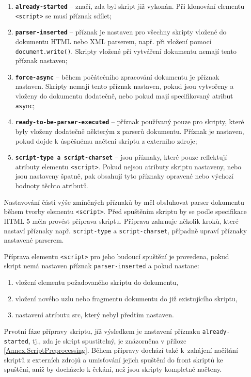 \begin{enumerate}
  \item \textbf{\texttt{already-started}} -- značí, zda byl skript již vykonán. Při klonování elementu \texttt{<script>} se musí příznak sdílet;
  \item \textbf{\texttt{parser-inserted}} -- příznak je nastaven pro všechny skripty vložené do dokumentu HTML nebo XML parserem, např. při vložení pomocí \texttt{document.write()}. Skripty vložené při vytváření dokumentu nemají tento příznak nastaven;
  \item \textbf{\texttt{force-async}} -- během počátečního zpracování dokumentu je příznak nastaven. Skripty nemají tento příznak nastaven, pokud jsou vytvořeny a vloženy do dokumentu dodatečně, nebo pokud mají specifikovaný atribut \texttt{async};
  \item \textbf{\texttt{ready-to-be-parser-executed}} -- příznak používaný pouze pro skripty, které byly vloženy dodatečně některým z parserů dokumentu. Příznak je nastaven, pokud dojde k úspěšnému načtení skriptu z externího zdroje;
  \item \textbf{\texttt{script-type a script-charset}} -- jsou příznaky, které pouze reflektují atributy elementu \texttt{<script>}. Pokud nejsou atributy skriptu nastaveny, nebo jsou nastaveny špatně, pak obsahují tyto příznaky opravené nebo výchozí hodnoty těchto atributů.
\end{enumerate}

Nastavování části výše zmíněných příznaků by měl obsluhovat parser dokumentu během tvorby elementu \texttt{<script>}. Před spuštěním skriptu by se podle specifikace HTML 5 měla provést příprava skriptu. Příprava zahrnuje několik kroků, které nastaví příznaky např. \texttt{script-type} a \texttt{script-charset}, případně upraví příznaky nastavené parserem. 

Příprava elementu \texttt{<script>} pro jeho budoucí spuštění je provedena, pokud skript nemá nastaven příznak \texttt{parser-inserted} a pokud nastane:

\begin{enumerate}
  \item vložení elementu požadovaného skriptu do dokumentu,
  \item vložení nového uzlu nebo fragmentu dokumentu do již existujícího skriptu,
  \item nastavení atributu src, který nebyl předtím nastaven.
\end{enumerate}

Prvotní fáze přípravy skriptu, jíž výsledkem je nastavení příznaku \texttt{already-started}, tj., zda je skript spustitelný, je znázorněna v příloze \ref{Annex.ScriptPreprocessing}. Během přípravy dochází také k~zahájení načítání skriptů z externích zdrojů a umisťování jejich spuštění do front skriptů ke spuštění, aniž by docházelo k čekání, než jsou skripty kompletně načteny. 

